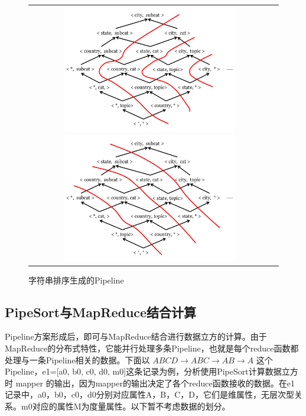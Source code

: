 \begin{figure}[!htb]
\begin{tabular}{cc}

\begin{minipage}[t]{0.5\textwidth}
\centering\includegraphics[width=3in]{picture/ch_terasort_mr/greedy_pipeline} 
\caption{随机贪心生成的Pipeline}\label{greedy_pipeline} 
\end{minipage}

\begin{minipage}[t]{0.5\textwidth}
\centering\includegraphics[width=3in]{picture/ch_terasort_mr/sort_pipeline} 
\caption{字符串排序生成的Pipeline}\label{sort_pipeline} 
\end{minipage}

\end{tabular}
\end{figure}

\subsection{PipeSort与MapReduce结合计算}

Pipeline方案形成后，即可与MapReduce结合进行数据立方的计算。由于MapReduce的分布式特性，它能并行处理多条Pipeline，也就是每个reduce函数都处理与一条Pipeline相关的数据。下面以 $ABCD\rightarrow ABC\rightarrow AB\rightarrow A$ 这个Pipeline，e1=[a0, b0, c0, d0, m0]这条记录为例，分析使用PipeSort计算数据立方时 mapper 的输出，因为mapper的输出决定了各个reduce函数接收的数据。在e1 记录中，a0，b0，c0，d0分别对应属性A，B，C，D，它们是维属性，无层次型关系。m0对应的属性M为度量属性。以下暂不考虑数据的划分。

